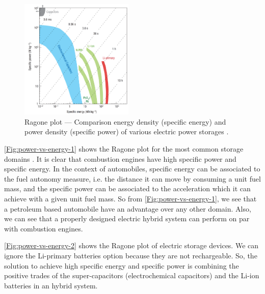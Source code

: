 \documentclass[journal]{IEEEtran}
\begin{document}
\begin{figure}
	\centering
	\includegraphics[width=0.48\textwidth]{power-vs-energy-density}
	\caption{Ragone plot --- Comparison energy density (specific energy) and power density (specific power) of various electric power storages \cite{simon2008materials}.}
	\label{Fig:power-vs-energy-2}
\end{figure}
\autoref{Fig:power-vs-energy-1} shows the Ragone plot for the most common storage domains \cite{simon2008materials}. It is clear that combustion engines have high specific power and specific energy. In the context of automobiles, specific energy can be associated to the fuel autonomy measure, i.e. the distance it can move by consuming a unit fuel mass, and the specific power can be associated to the acceleration which it can achieve with a given unit fuel mass. So from \autoref{Fig:power-vs-energy-1}, we see that a petroleum based automobile have an advantage over any other domain. Also, we can see that a properly designed electric hybrid system can perform on par with combustion engines.

\autoref{Fig:power-vs-energy-2} shows the Ragone plot of electric storage devices. We can ignore the Li-primary batteries option because they are not rechargeable. So, the solution to achieve high specific energy and specific power is combining the positive trades of the super-capacitors (electrochemical capacitors) and the Li-ion batteries in an hybrid system.
\end{document}
